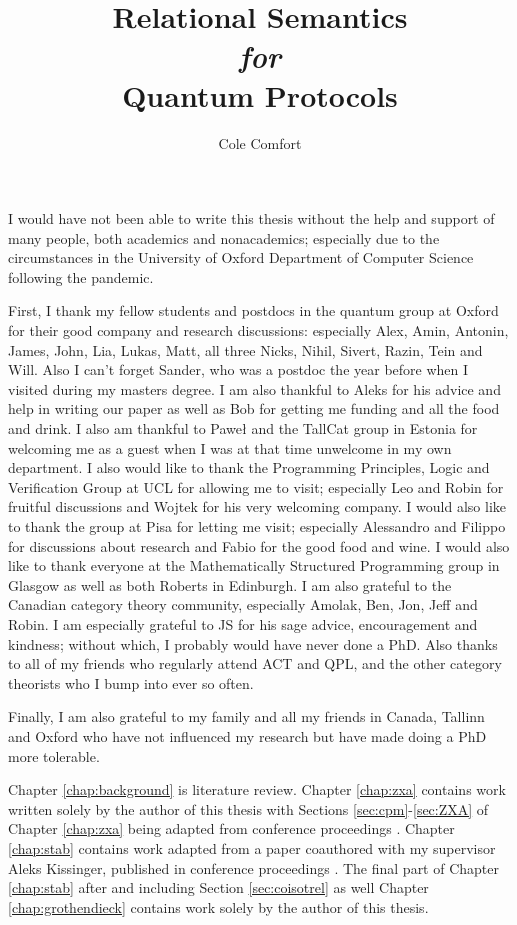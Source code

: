 \documentclass[12pt]{ociamthesis}  %
\title{Relational Semantics \\{ \it \Large for}\\ Quantum Protocols}
\author{Cole Comfort}
\begin{document}
\maketitle



\begin{acknowledgements}

I would have not been able to write this thesis without the help and support of many people, both academics and nonacademics;  especially due to the circumstances in the University of  Oxford Department of Computer Science following the pandemic.

First, I thank my fellow students and postdocs in the quantum group at  Oxford for their good company and research discussions: especially Alex,  Amin, Antonin, James, John, Lia, Lukas, Matt, all three Nicks, Nihil, Sivert, Razin, Tein and Will.  Also I can't forget Sander, who was a postdoc the year before when I visited during my masters degree.
I am also thankful to Aleks for his advice and help in writing our paper as well as Bob for getting me funding and all the  food and drink.
I also am thankful to Pawe\l{} and the TallCat group in Estonia for welcoming me as a guest when I was at that time unwelcome in my own department.  I also would like to thank the Programming Principles, Logic and Verification Group at UCL for allowing me to visit; especially Leo and Robin for fruitful discussions and Wojtek for his very welcoming company. I would also like to thank the group at Pisa for letting me visit; especially Alessandro and Filippo for discussions about research and Fabio for the good food and wine. I would also like to thank everyone at the Mathematically Structured Programming group in Glasgow as well as both Roberts in Edinburgh.
I am also grateful to the Canadian category theory community, especially Amolak, Ben, Jon, Jeff and Robin.  I am especially grateful to JS for his sage advice, encouragement and kindness; without which, I probably would have never done a PhD.  Also thanks to all of my friends who regularly attend ACT and QPL, and the other category theorists who I bump into ever so often.

Finally, I am also grateful to my family and all my friends in Canada, Tallinn and Oxford who have not influenced my research but have made doing a PhD more tolerable.

\end{acknowledgements}



\begin{originality}
Chapter \ref{chap:background} is  literature review.  Chapter \ref{chap:zxa} contains work written solely by the author of this thesis with Sections \ref{sec:cpm}-\ref{sec:ZXA} of Chapter \ref{chap:zxa} being adapted from conference proceedings \cite{zxa}.  Chapter \ref{chap:stab} contains work adapted from a paper coauthored with my supervisor Aleks Kissinger, published in conference proceedings \cite{lagrel}.  The final part of Chapter  \ref{chap:stab} after and including Section \ref{sec:coisotrel} as well Chapter \ref{chap:grothendieck} contains work solely by the author of this thesis.
\end{originality}
\end{document}
